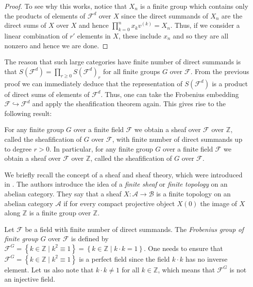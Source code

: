 \documentclass[a4paper,reqno,oneside]{article}
\begin{document}
\begin{proof}
To see why this works, notice that $X_{n}$ is a finite group which contains only the products of elements of $\mathcal{F}^d$ over $X$ since the direct summands of $X_{n}$ are the direct sums of $X$ over $X$ and hence $\prod_{k=0}^{n} x_{k}v^{(k)}=X_{n}$. Thus, if we consider a linear combination of $r'$ elements in $X$, these include $x_{n}$ and so they are all nonzero and hence we are done.
\end{proof}

The reason that such large categories have finite number of direct summands is that $S(\mathcal{F}^d)=\prod_{r \geq 0} S(\mathcal{F}^d)_r$ for all finite groups $G$ over $\mathcal{F}$. From the previous proof we can immediately deduce that the representation of $S(\mathcal{F}^d)$ is a product of direct sums of elements of $\mathcal{F}^d$. Thus, one can take the Frobenius embedding $\mathcal{F}\hookrightarrow \mathcal{F}^d$ and apply the sheafification theorem again. This gives rise to the following result:

\begin{theorem}\label{thm:sheafify_finite_groups}
For any finite group $G$ over a finite field $\mathcal{F}$ we obtain a sheaf over $\mathcal{F}$ over $\mathbb{Z}$, called the sheafification of $G$ over $\mathcal{F}$, with finite number of direct summands up to degree $r>0$. In particular, for any finite group $G$ over a finite field $\mathcal{F}$ we obtain a sheaf over $\mathcal{F}$ over $\mathbb{Z}$, called the sheafification of $G$ over $\mathcal{F}$.
\end{theorem}

We briefly recall the concept of a sheaf and sheaf theory, which were introduced in \cite{Shulman:3851091}. The authors introduce the idea of a {\em finite sheaf} or {\em finite topology} on an abelian category. They say that a sheaf $X:\mathcal{A}\rightarrow \mathcal{B}$ is a finite topology on an abelian category $\mathcal{A}$ if for every compact projective object $X(0)$ the image of $X$ along $\mathbb{Z}$ is a finite group over $\mathbb{Z}.$

Let $\mathcal{F}$ be a field with finite number of direct summands. The {\em Frobenius group of finite group $G$} over $\mathcal{F}$ is defined by $\mathcal{F}^G=\left\{k\in \mathbb{Z}\mid k^2 \equiv 1\right\}=\left\{k\in \mathbb{Z}\mid k\cdot k = 1\right\}.$ One needs to ensure that $\mathcal{F}^G=\left\{k\in \mathbb{Z}\mid k^2 \equiv 1\right\}$ is a perfect field since the field $k\cdot k$ has no inverse element. Let us also note that $k\cdot k\neq 1$ for all $k\in \mathbb{Z}$, which means that $\mathcal{F}^G$ is not an injective field. 
\end{document}

